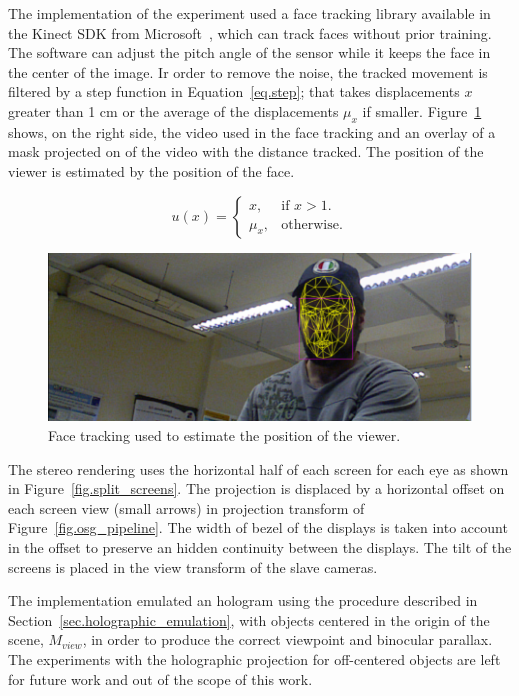 The implementation of the experiment used a face tracking library available in the Kinect SDK from Microsoft~\cite{Zhang2012}, which can track faces without prior training. The software can adjust the pitch angle of the sensor while it keeps the face in the center of the image. Ir order to remove the noise, the tracked movement is filtered by a step function in Equation~\ref{eq.step}; that takes displacements $x$ greater than 1 cm or the average of the displacements $\mu_x$ if smaller. Figure~\ref{fig.tracking} shows, on the right side, the video used in the face tracking and an overlay of a mask projected on of the video with the distance tracked. The position of the viewer is estimated by the position of the face.

\begin{equation}
  u(x)=\begin{cases}
    x, & \text{if $x>1$}.\\
    \mu_{x}, & \text{otherwise}.
  \end{cases}
  \label{eq.step}
\end{equation}

\begin{figure}[!hbt]
\centering
\includegraphics[width=0.7\linewidth,keepaspectratio=true]{figs/tracking_face.png}
\caption{Face tracking used to estimate the position of the viewer.}
\label{fig.tracking}
\end{figure}

The stereo rendering uses the horizontal half of each screen for each eye as shown in Figure~\ref{fig.split_screens}. The projection is displaced by a horizontal offset on each screen view (small arrows) in projection transform of Figure~\ref{fig.osg_pipeline}. The width of bezel of the displays is taken into account in the offset to preserve an hidden continuity between the displays. The tilt of the screens is placed in the view transform of the slave cameras.

The implementation emulated an hologram using the procedure described in Section~\ref{sec.holographic_emulation}, with objects centered in the origin of the scene, $M_{view}$, in order to produce the correct viewpoint and binocular parallax. The experiments with the holographic projection for off-centered objects are left for future work and out of the scope of this work.

